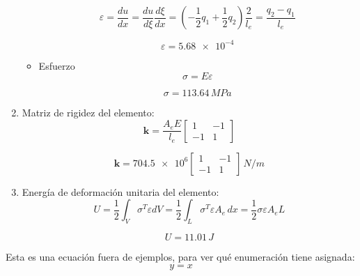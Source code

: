 \begin{example}
\begin{enumerate}[label=\textbf{\arabic*}.]
\begin{itemize}
	\begin{equation}
		\varepsilon = \dfrac{du}{dx} = \dfrac{du}{d \xi} \dfrac{d \xi}{dx} = \left( -\dfrac{1}{2} q_1 + \dfrac{1}{2}q_2 \right) \dfrac{2}{l_e} = \dfrac{q_2 - q_1}{l_e}
		\label{eq:epsilon_tema2}
	\end{equation}
	
	$$
	\boxed{\varepsilon = \num{5.68e-4}}
	$$
	
	\item Esfuerzo
	$$
	\sigma = E \varepsilon
	$$
	
	$$
	\boxed{\sigma = 113.64 \, \unit{MPa}}
	$$
\end{itemize}

\item Matriz de rigidez del elemento:
		$$
\mathbf{k} = \dfrac{A_eE}{l_e} \left[ \begin{array}{rr}
	1 & -1 \\ -1 & 1
\end{array} \right]
$$

$$
\boxed{\mathbf{k} = \num{704.5e6} \left[ \begin{array}{rr}
		1 & -1 \\ -1 & 1
	\end{array} \right] \, \unit{N/m} }
$$

\item Energía de deformación unitaria del elemento:
$$
U = \dfrac{1}{2} \int_V \sigma^T \varepsilon dV = \dfrac{1}{2} \int_L \sigma^T \varepsilon A_e \, dx = \dfrac{1}{2} \sigma \varepsilon A_e L
$$

$$
\boxed{U = 11.01 \, \unit{J}}
$$
\end{enumerate}
\end{example}

Esta es una ecuación fuera de ejemplos, para ver qué enumeración tiene asignada:
\begin{equation}
	y=x
\end{equation}

